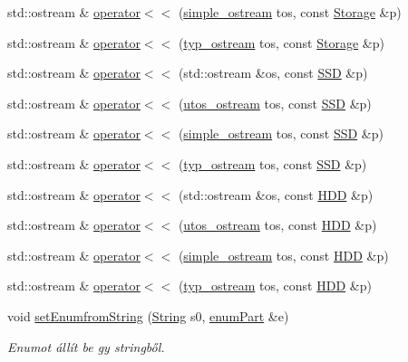 \begin{DoxyCompactItemize}
\item 
std\+::ostream \& \mbox{\hyperlink{_parts_8cpp_a1588d091b5539573f5ea874195316be8}{operator$<$$<$}} (\mbox{\hyperlink{structsimple__ostream}{simple\+\_\+ostream}} tos, const \mbox{\hyperlink{class_storage}{Storage}} \&p)
\item 
std\+::ostream \& \mbox{\hyperlink{_parts_8cpp_ae31f46106a3205c5c4b55ab77df28f02}{operator$<$$<$}} (\mbox{\hyperlink{structtyp__ostream}{typ\+\_\+ostream}} tos, const \mbox{\hyperlink{class_storage}{Storage}} \&p)
\item 
std\+::ostream \& \mbox{\hyperlink{_parts_8cpp_ac6bdcededa1d9e3fdb9bf9e48a5eff40}{operator$<$$<$}} (std\+::ostream \&os, const \mbox{\hyperlink{class_s_s_d}{S\+SD}} \&p)
\item 
std\+::ostream \& \mbox{\hyperlink{_parts_8cpp_a08d554261caa1fb75148667904a77ad3}{operator$<$$<$}} (\mbox{\hyperlink{structutos__ostream}{utos\+\_\+ostream}} tos, const \mbox{\hyperlink{class_s_s_d}{S\+SD}} \&p)
\item 
std\+::ostream \& \mbox{\hyperlink{_parts_8cpp_a22248534ae2ce8945c3d17875723c726}{operator$<$$<$}} (\mbox{\hyperlink{structsimple__ostream}{simple\+\_\+ostream}} tos, const \mbox{\hyperlink{class_s_s_d}{S\+SD}} \&p)
\item 
std\+::ostream \& \mbox{\hyperlink{_parts_8cpp_a9641770d879b0bc47fbf5d8ac770022c}{operator$<$$<$}} (\mbox{\hyperlink{structtyp__ostream}{typ\+\_\+ostream}} tos, const \mbox{\hyperlink{class_s_s_d}{S\+SD}} \&p)
\item 
std\+::ostream \& \mbox{\hyperlink{_parts_8cpp_ab32c05e13dae5fcc5abde983898567ef}{operator$<$$<$}} (std\+::ostream \&os, const \mbox{\hyperlink{class_h_d_d}{H\+DD}} \&p)
\item 
std\+::ostream \& \mbox{\hyperlink{_parts_8cpp_a59d777ba1e3bc0c9c209fb084ce91aa3}{operator$<$$<$}} (\mbox{\hyperlink{structutos__ostream}{utos\+\_\+ostream}} tos, const \mbox{\hyperlink{class_h_d_d}{H\+DD}} \&p)
\item 
std\+::ostream \& \mbox{\hyperlink{_parts_8cpp_a1d1044f0dc89f56e951c00d96745d0ef}{operator$<$$<$}} (\mbox{\hyperlink{structsimple__ostream}{simple\+\_\+ostream}} tos, const \mbox{\hyperlink{class_h_d_d}{H\+DD}} \&p)
\item 
std\+::ostream \& \mbox{\hyperlink{_parts_8cpp_a1e49a5684d214884445782cc35228aea}{operator$<$$<$}} (\mbox{\hyperlink{structtyp__ostream}{typ\+\_\+ostream}} tos, const \mbox{\hyperlink{class_h_d_d}{H\+DD}} \&p)
\item 
void \mbox{\hyperlink{_parts_8cpp_a63d667335dd064350b67cadf16011241}{set\+Enumfrom\+String}} (\mbox{\hyperlink{class_string}{String}} s0, \mbox{\hyperlink{_parts_8h_abddff37837f171d72a2e16a1448a3943}{enum\+Part}} \&e)
\begin{DoxyCompactList}\small\item\em Enumot állít be gy stringből. \end{DoxyCompactList}\end{DoxyCompactItemize}



